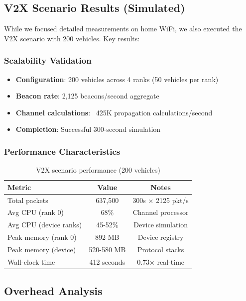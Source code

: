 \subsection{V2X Scenario Results (Simulated)}

While we focused detailed measurements on home WiFi, we also executed the V2X scenario with 200 vehicles. Key results:

\subsubsection{Scalability Validation}

\begin{itemize}
    \item \textbf{Configuration}: 200 vehicles across 4 ranks (50 vehicles per rank)
    \item \textbf{Beacon rate}: 2,125 beacons/second aggregate
    \item \textbf{Channel calculations}: ~425K propagation calculations/second
    \item \textbf{Completion}: Successful 300-second simulation
\end{itemize}

\subsubsection{Performance Characteristics}

\begin{table}[htbp]
\centering
\caption{V2X scenario performance (200 vehicles)}
\label{tab:v2x-performance}
\begin{tabular}{@{}lcc@{}}
\toprule
\textbf{Metric} & \textbf{Value} & \textbf{Notes} \\
\midrule
Total packets & 637,500 & 300s × 2125 pkt/s \\
Avg CPU (rank 0) & 68\% & Channel processor \\
Avg CPU (device ranks) & 45-52\% & Device simulation \\
Peak memory (rank 0) & 892 MB & Device registry \\
Peak memory (device) & 520-580 MB & Protocol stacks \\
Wall-clock time & 412 seconds & 0.73× real-time \\
\bottomrule
\end{tabular}
\end{table}

\subsection{Overhead Analysis}

